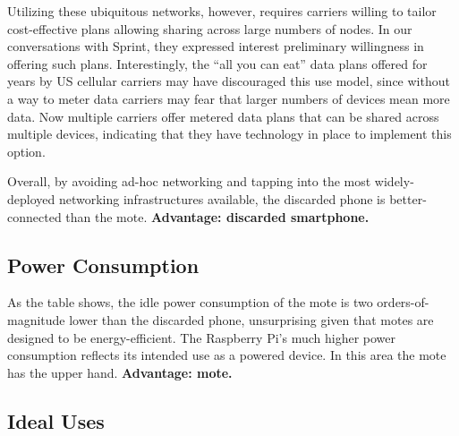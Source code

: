Utilizing these ubiquitous networks, however, requires carriers willing to
tailor cost-effective plans allowing sharing across large numbers of nodes.
In our conversations with Sprint, they expressed interest preliminary
willingness in offering such plans. Interestingly, the ``all you can eat''
data plans offered for years by US cellular carriers may have discouraged
this use model, since without a way to meter data carriers may fear that
larger numbers of devices mean more data. Now multiple carriers offer metered
data plans that can be shared across multiple devices, indicating that they
have technology in place to implement this option.

Overall, by avoiding ad-hoc networking and tapping into the most
widely-deployed networking infrastructures available, the discarded phone is
better-connected than the mote. \textbf{Advantage: discarded smartphone.}

\subsection{Power Consumption}

As the table shows, the idle power consumption of the mote is two
orders-of-magnitude lower than the discarded phone, unsurprising given that
motes are designed to be energy-efficient. The Raspberry Pi's much higher
power consumption reflects its intended use as a powered device. In this area
the mote has the upper hand. \textbf{Advantage: mote.}

\subsection{Ideal Uses}

